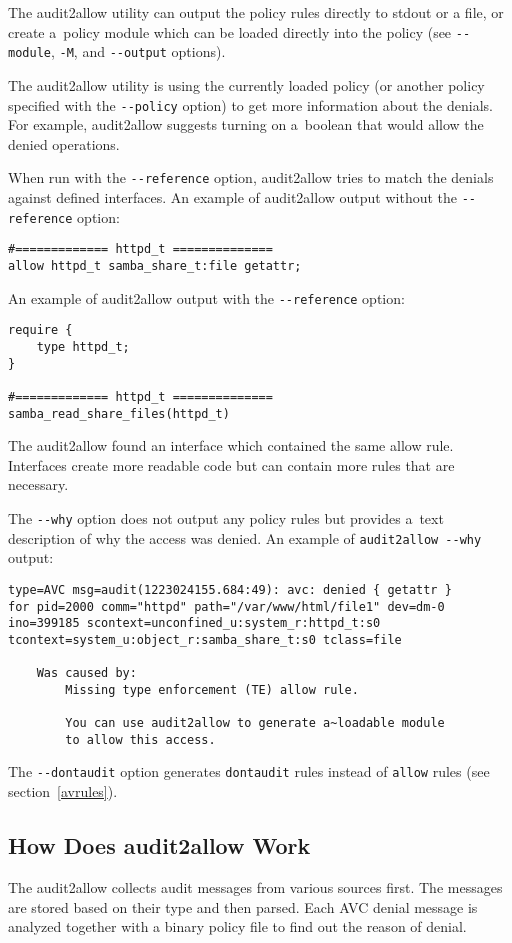 The audit2allow utility can output the policy rules directly to stdout or a
file, or create a~policy module which can be loaded directly into the policy
(see \texttt{-{}-module}, \texttt{-M}, and \texttt{-{}-output} options).

The audit2allow utility is using the currently loaded policy (or another policy
specified with the \texttt{-{}-policy} option) to get more information about the
denials. For example, audit2allow suggests turning on a~boolean that would allow
the denied operations.

When run with the \texttt{-{}-reference} option, audit2allow tries to match the
denials against defined interfaces. An example of audit2allow output without the
\texttt{-{}-reference} option:
\begin{lstlisting}
#============= httpd_t ==============
allow httpd_t samba_share_t:file getattr;
\end{lstlisting}
An example of audit2allow output with the \texttt{-{}-reference} option:
\begin{lstlisting}
require {
	type httpd_t;
}

#============= httpd_t ==============
samba_read_share_files(httpd_t)
\end{lstlisting}
The audit2allow found an interface which contained the same allow rule.
Interfaces create more readable code but can contain more rules that are
necessary.

The \texttt{-{}-why} option does not output any policy rules but provides a~text
description of why the access was denied. An example of \texttt{audit2allow
-{}-why} output:
\begin{lstlisting}
type=AVC msg=audit(1223024155.684:49): avc: denied { getattr }
for pid=2000 comm="httpd" path="/var/www/html/file1" dev=dm-0
ino=399185 scontext=unconfined_u:system_r:httpd_t:s0
tcontext=system_u:object_r:samba_share_t:s0 tclass=file

    Was caused by:
        Missing type enforcement (TE) allow rule.

        You can use audit2allow to generate a~loadable module
        to allow this access.
\end{lstlisting}

The \texttt{-{}-dontaudit} option generates \texttt{dontaudit} rules instead of
\texttt{allow} rules (see section~\ref{avrules}).

\subsection{How Does audit2allow Work}
The audit2allow collects audit messages from various sources first. The messages
are stored based on their type and then parsed. Each AVC denial message is
analyzed together with a binary policy file to find out the reason of denial.

